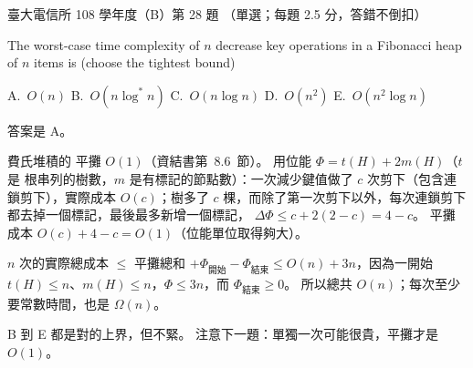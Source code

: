 \begin{pastexam}[label={px:ntu-108-comm-dsab-28}]{臺大電信所 108 學年度（B）第 28 題}
（單選；每題 2.5 分，答錯不倒扣）

The worst-case time complexity of $n$ decrease key operations in a Fibonacci heap of $n$ items is
(choose the tightest bound)

A.~$O(n)$ \qquad B.~$O(n\log^* n)$ \qquad C.~$O(n\log n)$ \qquad D.~$O(n^2)$ \qquad
E.~$O(n^2\log n)$
\end{pastexam}

\begin{pastsoln}
答案是 A。

費氏堆積的  平攤 $O(1)$（資結書第~8.6~節）。 用位能 $\Phi = t(H) + 2m(H)$（$t$ 是
根串列的樹數，$m$ 是有標記的節點數）：一次減少鍵值做了 $c$ 次剪下（包含連鎖剪下），實際成本
$O(c)$；樹多了 $c$ 棵，而除了第一次剪下以外，每次連鎖剪下都去掉一個標記，最後最多新增一個標記，
$\Delta\Phi \le c + 2(2 - c) = 4 - c$。 平攤成本 $O(c) + 4 - c = O(1)$（位能單位取得夠大）。

$n$ 次的實際總成本 $\le$ 平攤總和 $+ \Phi_{\text{開始}} - \Phi_{\text{結束}} \le O(n) + 3n$，因為一開始
$t(H) \le n$、$m(H) \le n$，$\Phi \le 3n$，而 $\Phi_{\text{結束}} \ge 0$。 所以總共 $O(n)$；每次至少
要常數時間，也是 $\Omega(n)$。

B 到 E 都是對的上界，但不緊。 注意下一題：單獨一次可能很貴，平攤才是 $O(1)$。
\end{pastsoln}
